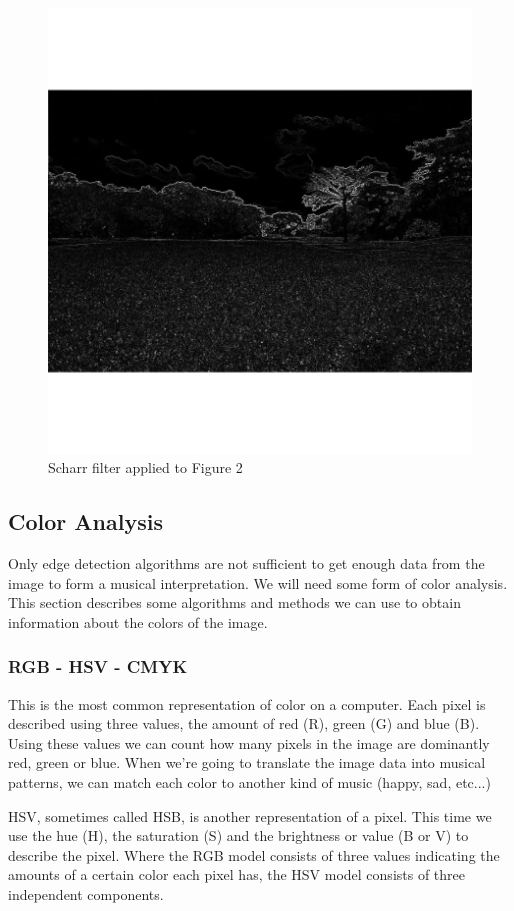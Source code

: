 \documentclass[12pt]{article}
\begin{document}
\begin{figure}[h]
\centering
\includegraphics[scale = 0.45]{img/landscape_Scharr}
\caption{Scharr filter applied to Figure 2}
\end{figure}
\newpage

\subsection{Color Analysis}
Only edge detection algorithms are not sufficient to get enough data from the image to form a musical interpretation. We will need some form of color analysis. This section describes some algorithms and methods we can use to obtain information about the colors of the image.

\subsubsection{RGB - HSV - CMYK}
This is the most common representation of color on a computer. Each pixel is described using three values, the amount of red (R), green (G) and blue (B). Using these values we can count how many pixels in the image are dominantly red, green or blue. When we're going to translate the image data into musical patterns, we can match each color to another kind of music (happy, sad, etc...)
\newline

HSV, sometimes called HSB, is another representation of a pixel. This time we use the hue (H), the saturation (S) and the brightness or value (B or V) to describe the pixel. Where the RGB model consists of three values indicating the amounts of a certain color each pixel has, the HSV model consists of three independent components. 
\newline
\end{document}
